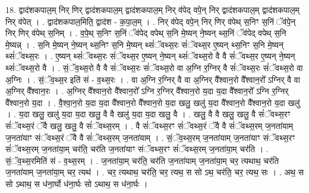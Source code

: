 \documentclass[17pt]{extarticle}
\begin{document}
18. द्वाद॑शकपाल॒म् निर् णिर् द्वाद॑शकपाल॒म् द्वाद॑शकपाल॒म् निर् व॑पेद् वपे॒न् निर् द्वाद॑शकपाल॒म् द्वाद॑शकपाल॒म् निर् व॑पेत् । . द्वाद॑शकपाल॒मिति॒ द्वाद॑श - क॒पा॒ल॒म् । . निर् व॑पेद् वपे॒न् निर् णिर् व॑पेथ् स॒निꣳ स॒निं ॅव॑पे॒न् निर् णिर् व॑पेथ् स॒निम् । . व॒पे॒थ् स॒निꣳ स॒निं ॅव॑पेद् वपेथ् स॒नि मे॒ष्यन् ने॒ष्यन् थ्स॒निं ॅव॑पेद् वपेथ् स॒नि मे॒ष्यन्न् । . स॒नि मे॒ष्यन् ने॒ष्यन् थ्स॒निꣳ स॒नि मे॒ष्यन् थ्सं॑ॅवथ्स॒रः सं॑ॅवथ्स॒र ए॒ष्यन् थ्स॒निꣳ स॒नि मे॒ष्यन् थ्सं॑ॅवथ्स॒रः । . ए॒ष्यन् थ्सं॑ॅवथ्स॒रः सं॑ॅवथ्स॒र ए॒ष्यन् ने॒ष्यन् थ्सं॑ॅवथ्स॒रो वै वै सं॑ॅवथ्स॒र ए॒ष्यन् ने॒ष्यन् थ्सं॑ॅवथ्स॒रो वै । . सं॒ॅव॒थ्स॒रो वै वै सं॑ॅवथ्स॒रः सं॑ॅवथ्स॒रो वा अ॒ग्नि र॒ग्निर् वै सं॑ॅवथ्स॒रः सं॑ॅवथ्स॒रो वा अ॒ग्निः । . सं॒ॅव॒थ्स॒र इति॑ सं - व॒थ्स॒रः । . वा अ॒ग्नि र॒ग्निर् वै वा अ॒ग्निर् वै᳚श्वान॒रो वै᳚श्वान॒रो᳚ ऽग्निर् वै वा अ॒ग्निर् वै᳚श्वान॒रः । . अ॒ग्निर् वै᳚श्वान॒रो वै᳚श्वान॒रो᳚ ऽग्नि र॒ग्निर् वै᳚श्वान॒रो य॒दा य॒दा वै᳚श्वान॒रो᳚ ऽग्नि र॒ग्निर् वै᳚श्वान॒रो य॒दा । . वै॒श्वा॒न॒रो य॒दा य॒दा वै᳚श्वान॒रो वै᳚श्वान॒रो य॒दा खलु॒ खलु॑ य॒दा वै᳚श्वान॒रो वै᳚श्वान॒रो य॒दा खलु॑ । . य॒दा खलु॒ खलु॑ य॒दा य॒दा खलु॒ वै वै खलु॑ य॒दा य॒दा खलु॒ वै । . खलु॒ वै वै खलु॒ खलु॒ वै सं॑ॅवथ्स॒रꣳ सं॑ॅवथ्स॒रं ॅवै खलु॒ खलु॒ वै सं॑ॅवथ्स॒रम् । . वै सं॑ॅवथ्स॒रꣳ सं॑ॅवथ्स॒रं ॅवै वै सं॑ॅवथ्स॒रम् ज॒नता॑याम् ज॒नता॑याꣳ संॅवथ्स॒रं ॅवै वै सं॑ॅवथ्स॒रम् ज॒नता॑याम् । . सं॒ॅव॒थ्स॒रम् ज॒नता॑याम् ज॒नता॑याꣳ संॅवथ्स॒रꣳ सं॑ॅवथ्स॒रम् ज॒नता॑या॒म् चर॑ति॒ चर॑ति ज॒नता॑याꣳ संॅवथ्स॒रꣳ सं॑ॅवथ्स॒रम् ज॒नता॑या॒म् चर॑ति । . सं॒ॅव॒थ्स॒रमिति॑ सं - व॒थ्स॒रम् । . ज॒नता॑या॒म् चर॑ति॒ चर॑ति ज॒नता॑याम् ज॒नता॑या॒म् चर॒ त्यथाथ॒ चर॑ति ज॒नता॑याम् ज॒नता॑या॒म् चर॒ त्यथ॑ । . चर॒ त्यथाथ॒ चर॑ति॒ चर॒ त्यथ॒ स सो ऽथ॒ चर॑ति॒ चर॒ त्यथ॒ सः । . अथ॒ स सो ऽथाथ॒ स ध॑ना॒र्घो ध॑ना॒र्घः सो ऽथाथ॒ स ध॑ना॒र्घः । \newline
\end{document}
